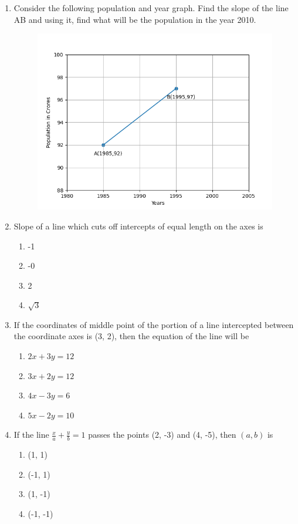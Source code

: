\begin{enumerate}[label=\thesubsection.\arabic*, ref=\thesubsection.\theenumi]
\item Consider the following population and year graph. Find the slope of the line AB and using it,  find what will be the population in the year 2010.
\\
\begin{figure}[H]
\centering
\includegraphics[width=0.75\columnwidth]{chapters/11/10/1/14/figs/fig.png}
\caption{}
\label{fig:chapters/11/10/1/14/1}
\end{figure}
\solution

\item Slope of a line which cuts off intercepts of equal length on the axes is 
\begin{enumerate}
\item -1
\item -0
\item 2
\item $\sqrt{3}$
\end{enumerate}
\item If the coordinates of middle point of the portion of a line intercepted between the coordinate axes is (3, 2), then the equation of the line will be
\begin{enumerate}
\item $2x+3y=12$
\item $3x+2y=12$
\item $4x-3y=6$
\item $5x-2y=10$
\end{enumerate}
\item If the line $\frac{x}{a}+\frac{y}{b}=1$ passes the points (2, -3) and (4, -5),  then $(a, b)$ is 
\begin{enumerate}
\item (1, 1)
\item (-1, 1)
\item (1, -1)
\item (-1, -1)

\end{enumerate}
\end{enumerate}
